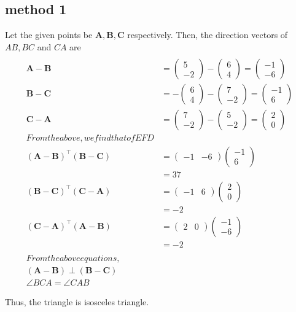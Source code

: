 \documentclass[10pt, a4paper]{article}
\providecommand{\brak}[1]{\ensuremath{\left(#1\right)}}
\newcommand{\myvec}[1]{\ensuremath{\begin{pmatrix}#1\end{pmatrix}}}
\let\vec\mathbf
\begin{document}
 \subsection{method 1}Let the given points be $\vec{A}, \vec{B}, \vec{C}$ respectively. 
Then, the direction vectors of $AB, BC$ and $CA$ are
\begin{align}
\\
\vec{A} -\vec{B}&= \myvec{5 \\ -2} -\myvec{6 \\ 4} = \myvec{-1 \\ -6}\\
\vec{B} -\vec{C}&=  -\myvec{6 \\ 4}-\myvec{7 \\ -2} = \myvec{-1 \\ 6}\\
\vec{C} -\vec{A}&= \myvec{7 \\ -2} -\myvec{5 \\ -2} = \myvec{2 \\ 0}\\
From the above,  we find that of EFD\\
\brak{\vec{A} -\vec{B}}^{\top}\brak{\vec{B} -\vec{C}}&=  \myvec{-1 & -6}\myvec{-1 \\ 6}\\
&=37\\
\brak{\vec{B} -\vec{C}}^{\top}\brak{\vec{C} -\vec{A}}&=  \myvec{-1 & 6}\myvec{2 \\ 0}\\
&=-2\\
\brak{\vec{C} -\vec{A}}^{\top}\brak{\vec{A} -\vec{B}}&=  \myvec{2 & 0}\myvec{-1 \\ -6}\\
&=-2\\
\\
From  the above equations, 
\\
\brak{\vec{A} -\vec{B}}\perp \brak{\vec{B} -\vec{C}}\\
\angle BCA = \angle CAB  
\end{align}
 
Thus, the triangle is isosceles triangle.
\end{document}
